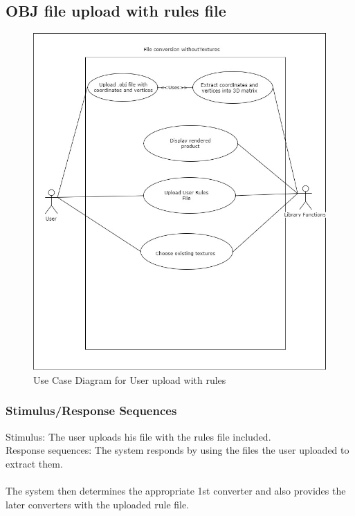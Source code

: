 \documentclass[english]{article}
\begin{document}
			 	\subsection{OBJ file upload with rules file}
			 	\begin{figure}[h]
			 		\includegraphics[width=\textwidth]{Use Cases/Upload with Rule file.jpg}
			 		\caption{Use Case Diagram for User upload with rules }
			 	\end{figure}
			 \subsubsection{Stimulus/Response Sequences}
			 	Stimulus: The user uploads his file with the rules file included.\\
			 	Response sequences: The system responds by using the files the user uploaded to extract them.\\\\
			 	 The system then determines the appropriate 1st converter and also provides the later converters with the uploaded rule file.
			 	 
\end{document}
